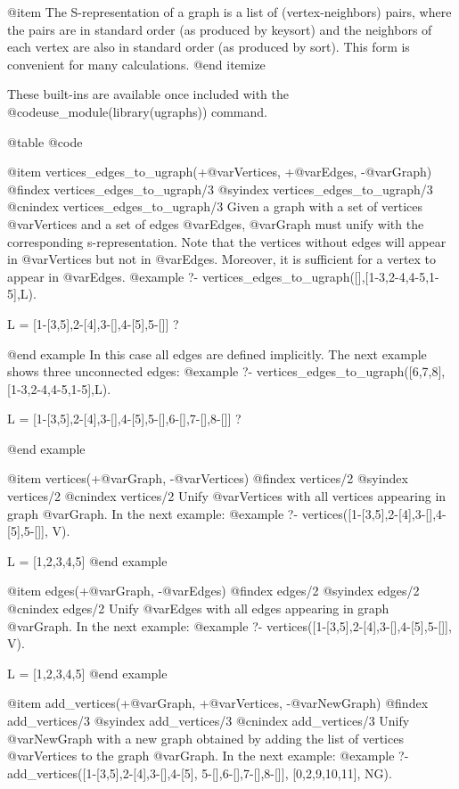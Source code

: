 {{{{{{{{{@item The S-representation of a graph is a list of (vertex-neighbors)
pairs, where the pairs are in standard order (as produced by keysort)
and the neighbors of each vertex are also in standard order (as
produced by sort).  This form is convenient for many calculations.
@end itemize

These built-ins are available once included with the
@code{use_module(library(ugraphs))} command.

@table @code

@item vertices_edges_to_ugraph(+@var{Vertices}, +@var{Edges}, -@var{Graph})
@findex  vertices_edges_to_ugraph/3
@syindex vertices_edges_to_ugraph/3
@cnindex vertices_edges_to_ugraph/3
Given a graph with a set of vertices @var{Vertices} and a set of edges
@var{Edges}, @var{Graph} must unify with the corresponding
s-representation. Note that the vertices without edges will appear in
@var{Vertices} but not in @var{Edges}. Moreover, it is sufficient for a
vertex to appear in @var{Edges}.
@example
?- vertices_edges_to_ugraph([],[1-3,2-4,4-5,1-5],L).

L = [1-[3,5],2-[4],3-[],4-[5],5-[]] ? 

@end example
In this case all edges are defined implicitly. The next example shows
three unconnected edges:
@example 
?- vertices_edges_to_ugraph([6,7,8],[1-3,2-4,4-5,1-5],L).

L = [1-[3,5],2-[4],3-[],4-[5],5-[],6-[],7-[],8-[]] ? 

@end example

@item vertices(+@var{Graph}, -@var{Vertices})
@findex  vertices/2
@syindex vertices/2
@cnindex vertices/2
Unify @var{Vertices} with all vertices appearing in graph
@var{Graph}. In the next example:
@example
?- vertices([1-[3,5],2-[4],3-[],4-[5],5-[]], V).

L = [1,2,3,4,5]
@end example

@item edges(+@var{Graph}, -@var{Edges})
@findex  edges/2
@syindex edges/2
@cnindex edges/2
Unify @var{Edges} with all edges appearing in graph
@var{Graph}. In the next example:
@example
?- vertices([1-[3,5],2-[4],3-[],4-[5],5-[]], V).

L = [1,2,3,4,5]
@end example

@item add_vertices(+@var{Graph}, +@var{Vertices}, -@var{NewGraph})
@findex  add_vertices/3
@syindex add_vertices/3
@cnindex add_vertices/3
Unify @var{NewGraph} with a new graph obtained by adding the list of
vertices @var{Vertices} to the graph @var{Graph}. In the next example:
@example
?- add_vertices([1-[3,5],2-[4],3-[],4-[5],
                 5-[],6-[],7-[],8-[]],
                [0,2,9,10,11],
                   NG).

}}}}}}}}}
